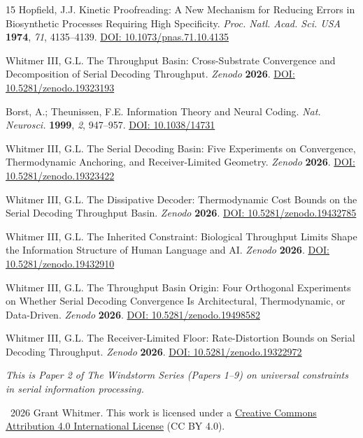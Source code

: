 \documentclass[11pt]{article}
\begin{document}
\begin{thebibliography}{15}
Hopfield, J.J.
Kinetic Proofreading: A New Mechanism for Reducing Errors in Biosynthetic Processes Requiring High Specificity.
\textit{Proc. Natl. Acad. Sci. USA} \textbf{1974}, \textit{71}, 4135--4139.
\href{https://doi.org/10.1073/pnas.71.10.4135}{DOI: 10.1073/pnas.71.10.4135}

Whitmer III, G.L.
The Throughput Basin: Cross-Substrate Convergence and Decomposition of Serial Decoding Throughput.
\textit{Zenodo} \textbf{2026}.
\href{https://doi.org/10.5281/zenodo.19323193}{DOI: 10.5281/zenodo.19323193}

Borst, A.; Theunissen, F.E.
Information Theory and Neural Coding.
\textit{Nat. Neurosci.} \textbf{1999}, \textit{2}, 947--957.
\href{https://doi.org/10.1038/14731}{DOI: 10.1038/14731}

Whitmer III, G.L.
The Serial Decoding Basin: Five Experiments on Convergence, Thermodynamic Anchoring, and Receiver-Limited Geometry.
\textit{Zenodo} \textbf{2026}.
\href{https://doi.org/10.5281/zenodo.19323422}{DOI: 10.5281/zenodo.19323422}

Whitmer III, G.L.
The Dissipative Decoder: Thermodynamic Cost Bounds on the Serial Decoding Throughput Basin.
\textit{Zenodo} \textbf{2026}.
\href{https://doi.org/10.5281/zenodo.19432785}{DOI: 10.5281/zenodo.19432785}

Whitmer III, G.L.
The Inherited Constraint: Biological Throughput Limits Shape the Information Structure of Human Language and AI.
\textit{Zenodo} \textbf{2026}.
\href{https://doi.org/10.5281/zenodo.19432910}{DOI: 10.5281/zenodo.19432910}

Whitmer III, G.L.
The Throughput Basin Origin: Four Orthogonal Experiments on Whether Serial Decoding Convergence Is Architectural, Thermodynamic, or Data-Driven.
\textit{Zenodo} \textbf{2026}.
\href{https://doi.org/10.5281/zenodo.19498582}{DOI: 10.5281/zenodo.19498582}

Whitmer III, G.L.
The Receiver-Limited Floor: Rate-Distortion Bounds on Serial Decoding Throughput.
\textit{Zenodo} \textbf{2026}.
\href{https://doi.org/10.5281/zenodo.19322972}{DOI: 10.5281/zenodo.19322972}

\end{thebibliography}

\vspace{2em}
\noindent\textit{This is Paper 2 of The Windstorm Series (Papers 1--9) on universal constraints in serial information processing.}

\vspace{1em}
\noindent\textcopyright~2026 Grant Whitmer. This work is licensed under a \href{https://creativecommons.org/licenses/by/4.0/}{Creative Commons Attribution 4.0 International License} (CC BY 4.0).
\end{document}
